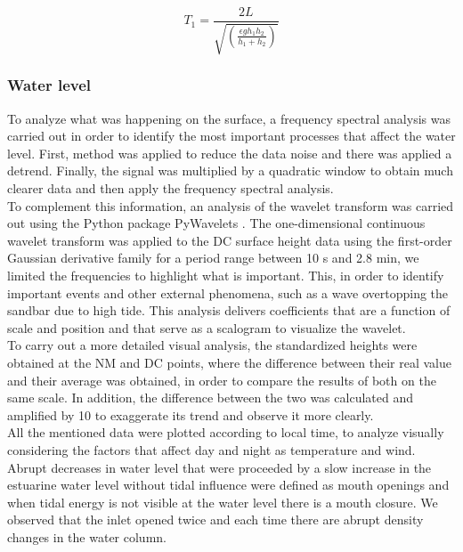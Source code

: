 \documentclass[tesis.tex]{subfiles}
\begin{document}
\begin{equation}
    T_1=\frac{2L}{\sqrt{(\frac{\epsilon g h_1 h_2}{h_1 + h_2})}}
    \label{eq: period}
\end{equation}

\subsubsection{Water level}

To analyze what was happening on the surface, a frequency spectral analysis was carried out in order to identify the most important processes that affect the water level. First, \cite{welch1967use} method was applied to reduce the data noise and there was applied a detrend. Finally, the signal was multiplied by a quadratic window to obtain much clearer data and then apply the frequency spectral analysis. \\

To complement this information, an analysis of the wavelet transform was carried out using the Python package PyWavelets \citep{lee2019pywavelets}. The one-dimensional continuous wavelet transform was applied to the DC surface height data using the first-order Gaussian derivative family for a period range between 10 s and 2.8 min, we limited the frequencies to highlight what is important. This, in order to identify important events and other external phenomena, such as a wave overtopping the sandbar due to high tide. This analysis delivers coefficients that are a function of scale and position and that serve as a scalogram to visualize the wavelet.\\

To carry out a more detailed visual analysis, the standardized heights were obtained at the NM and DC points, where the difference between their real value and their average was obtained, in order to compare the results of both on the same scale. In addition, the difference between the two was calculated and amplified by 10 to exaggerate its trend and observe it more clearly.\\

All the mentioned data were plotted according to local time, to analyze visually considering the factors that affect day and night as temperature and wind. Abrupt decreases in water level that were proceeded by a slow increase in the estuarine water level without tidal influence were defined as mouth openings and when tidal energy is not visible at the water level there is a mouth closure. We observed that the inlet opened twice and each time there are abrupt density changes in the water column.  
\end{document}
